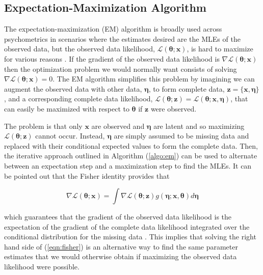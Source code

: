\documentclass[12pt]{article}
\begin{document}
\subsection*{Expectation-Maximization Algorithm}

The expectation-maximization (EM) algorithm is broadly used across psychometrics in scenarios where the estimates desired are the MLEs of the observed data, but the observed data likelihood, $\mathcal{L}(\bm{\theta};\bm{x})$, is hard to maximize for various reasons \cite{dempster}. If the gradient of the observed data likelihood is $\nabla\mathcal{L}(\bm{\theta};\bm{x})$ then the optimization problem we would normally want consists of solving $\nabla\mathcal{L}(\bm{\theta};\bm{x}) = 0$. The EM algorithm simplifies this problem by imagining we can augment the observed data with other data, $\bm{\eta}$, to form complete data, $\bm{z} = \{\bm{x}, \bm{\eta}\}$, and a corresponding complete data likelihood, $\mathcal{L}(\bm{\theta};\bm{z}) = \mathcal{L}(\bm{\theta};\bm{x},\bm{\eta})$, that can easily be maximized with respect to $\bm{\theta}$ if $\bm{z}$ were observed. 

The problem is that only $\bm{x}$ are observed and $\bm{\eta}$ are latent and so maximizing $\mathcal{L}(\bm{\theta};\bm{z})$ cannot occur. Instead, $\bm{\eta}$ are simply assumed to be missing data and replaced with their conditional expected values to form the complete data. Then, the iterative approach outlined in Algorithm (\ref{algo:em}) can be used to alternate between an expectation step and a maximization step to find the MLEs. It can be pointed out that the Fisher identity \cite{fisher_1925} provides that 

\begin{equation}
\label{eqn:fisher}
\nabla\mathcal{L}(\bm{\theta};\bm{x}) = \int \nabla\mathcal{L}(\bm{\theta};\bm{z})g(\bm{\eta};\bm{x},\bm{\theta})d\bm{\eta}
\end{equation} 

\noindent which guarantees that the gradient of the observed data likelihood is the expectation of the gradient of the complete data likelihood integrated over the conditional distribution for the missing data \cite{cai:fisher}. This implies that solving the right hand side of (\ref{eqn:fisher}) is an alternative way to find the same parameter estimates that we would otherwise obtain if maximizing the observed data likelihood were possible.  
\end{document}
